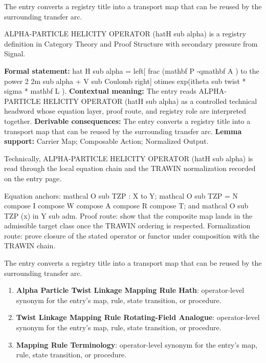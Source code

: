 The entry converts a registry title into a transport map that can be reused by the surrounding transfer arc.
\clearpage


\begingroup\small
{}
ALPHA-PARTICLE HELICITY OPERATOR (hatH sub alpha) is a registry definition in Category Theory and Proof Structure with secondary pressure from Signal.

\begingroup\footnotesize\setlength{\emergencystretch}{3em}\sloppy
\textbf{Formal statement:} hat H sub alpha = left[ frac (mathbf P -qmathbf A ) to the power 2 2m sub alpha + V sub Coulomb right] otimes exp(itheta sub twist * sigma * mathbf L ). \textbf{Contextual meaning:} The entry reads ALPHA-PARTICLE HELICITY OPERATOR (hatH sub alpha) as a controlled technical headword whose equation layer, proof route, and registry role are interpreted together. \textbf{Derivable consequences:} The entry converts a registry title into a transport map that can be reused by the surrounding transfer arc. \textbf{Lemma support:} Carrier Map; Composable Action; Normalized Output.\par
\endgroup

Technically, ALPHA-PARTICLE HELICITY OPERATOR (hatH sub alpha) is read through the local equation chain and the TRAWIN normalization recorded on the entry page.

Equation anchors: mathcal O sub TZP : X to Y; mathcal O sub TZP = N compose I compose W compose A compose R compose T; and mathcal O sub TZP (x) in Y sub adm. Proof route: show that the composite map lands in the admissible target class once the TRAWIN ordering is respected. Formalization route: prove closure of the stated operator or functor under composition with the TRAWIN chain.

The entry converts a registry title into a transport map that can be reused by the surrounding transfer arc.
\endgroup

\begin{enumerate}[leftmargin=1.6em,itemsep=6pt,topsep=4pt]
\item \textbf{Alpha Particle Twist Linkage Mapping Rule Hath}: operator-level synonym for the entry's map, rule, state transition, or procedure.
\item \textbf{Twist Linkage Mapping Rule Rotating-Field Analogue}: operator-level synonym for the entry's map, rule, state transition, or procedure.
\item \textbf{Mapping Rule Terminology}: operator-level synonym for the entry's map, rule, state transition, or procedure.
\end{enumerate}

